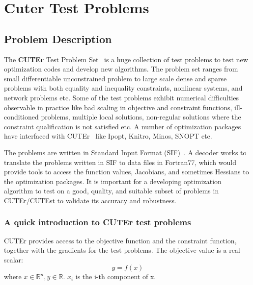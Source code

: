  
\chapter{Cuter Test Problems}
\section{Problem Description}\label{sec:cuter1}
The \textbf{CUTEr} Test Problem Set~\cite{cuter_opt, cuter_gould} is a huge collection of test problems to test new optimization codes and develop new algorithms. The problem set ranges from small differentiable unconstrained problem to large scale dense and sparse problems with both equality and inequality constraints, nonlinear systems, and network problems etc.  Some of the test problems exhibit numerical difficulties observable in practice like bad scaling in objective and constraint functions, ill-conditioned problems, multiple local solutions, non-regular solutions where the constraint qualification is not satisfied etc. A number of optimization packages have interfaced with CUTEr~\cite{cuter_interface} like Ipopt, Knitro, Minos, SNOPT etc.  

The problems are written in Standard Input Format (SIF)~\cite{Conn1992}. A decoder works to translate the problems written in SIF to data files in Fortran77, which would provide tools to access the function values, Jacobians, and sometimes Hessians to the optimization packages. It is important for a developing optimization algorithm to test on a good, quality, and suitable subset of problems in CUTEr/CUTEst to validate its accuracy and robustness. 

\subsection{A quick introduction to CUTEr test problems}\label{sec:cuternm}
CUTEr provides access to the objective function and the constraint function, together with the gradients for the test problems. The objective value is a real scalar: 
\begin{equation*}
y = f(x) 
\end{equation*}
where  $x \in \mathbb{R}^n, y \in \mathbb{R}$. $x_i$ is the i-th component of x. 

